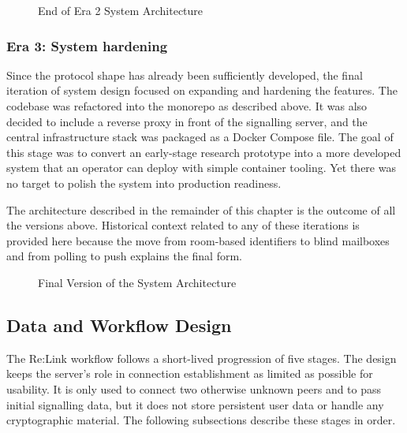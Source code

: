 \documentclass[12pt,a4paper]{article}
\begin{document}
\begin{figure}[htbp]
\centering
{}
\caption{End of Era 2 System Architecture}
\end{figure}

\subsubsection{Era 3: System hardening}

Since the protocol shape has already been sufficiently developed, the final iteration of system design focused on expanding and hardening the features. The codebase was refactored into the monorepo as described above. It was also decided to include a reverse proxy in front of the signalling server, and the central infrastructure stack was packaged as a Docker Compose file. The goal of this stage was to convert an early-stage research prototype into a more developed system that an operator can deploy with simple container tooling. Yet there was no target to polish the system into production readiness.

The architecture described in the remainder of this chapter is the outcome of all the versions above. Historical context related to any of these iterations is provided here because the move from room-based identifiers to blind mailboxes and from polling to push explains the final form.

\begin{figure}[htbp]
\centering
{}
\caption{Final Version of the System Architecture}
\end{figure}

\subsection{Data and Workflow Design}

The Re:Link workflow follows a short-lived progression of five stages. The design keeps the server’s role in connection establishment as limited as possible for usability. It is only used to connect two otherwise unknown peers and to pass initial signalling data, but it does not store persistent user data or handle any cryptographic material. The following subsections describe these stages in order.
\end{document}
